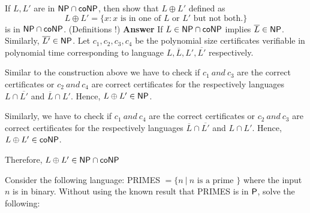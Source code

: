 \documentclass[addpoints,12pt]{exam}
\begin{document}
\begin{questions}
\question[5]
If $L, L'$ are in $\NP \cap \co\NP$, then show that $L \oplus  L'$ defined as 
\[ L \oplus L' = \{ x : x \textrm{ is in one of $L$ or $L'$ but not both.} \} \]
is in $\NP \cap \co\NP$. (Definitions !)\newline
\textbf{Answer} \newline
If $L \in \NP \cap \co\NP$ implies $\overline{L} \in \NP$. Similarly, $\overline{L'} \in \NP$.\newline
Let $c_{1},c_{2},c_{3},c_{4}$ be the polynomial size certificates verifiable in polynomial time corresponding to language $L,\overline{L},L',\overline{L'}$ respectively. \newline

Similar to the construction above we have to check if $c_{1}~and~c_{3}$ are the correct certificates or $c_{2}~and~c_{4}$ are correct certificates for the respectively
languages $L \cap \overline{L'}$ and $\overline{L} \cap L'$. Hence, $L \oplus  L' \in \NP$. \newline

Similarly, we have to check if $c_{1}~and~c_{4}$ are the correct certificates or $c_{2}~and~c_{3}$ are correct certificates for the respectively
languages $\overline{L} \cap \overline{L'}$ and $L \cap L'$. Hence, $L \oplus  L' \in \co\NP$.\newline

Therefore, $L \oplus  L' \in \NP \cap \co\NP$

\question[15]
Consider the following language: PRIMES $= \{ n ~|~ n
\textrm{ is a prime } \}$ where the input $n$ is in binary.  Without
using the known result that PRIMES is in $\P$, solve the following:
\end{questions}
\end{document}
